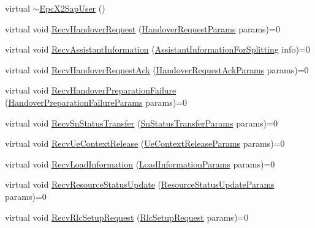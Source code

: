 \begin{DoxyCompactItemize}
\item 
virtual \hyperlink{classns3_1_1EpcX2SapUser_a8ae15c36ec4225df3cec2fdefcfc7837}{$\sim$\+Epc\+X2\+Sap\+User} ()
\item 
virtual void \hyperlink{classns3_1_1EpcX2SapUser_ac89cf3449fc971960e4c7a7a9af23c7d}{Recv\+Handover\+Request} (\hyperlink{structns3_1_1EpcX2Sap_1_1HandoverRequestParams}{Handover\+Request\+Params} params)=0
\item 
virtual void \hyperlink{classns3_1_1EpcX2SapUser_a4c52bc66e831a21ec8049e28760e2209}{Recv\+Assistant\+Information} (\hyperlink{structns3_1_1EpcX2Sap_1_1AssistantInformationForSplitting}{Assistant\+Information\+For\+Splitting} info)=0
\item 
virtual void \hyperlink{classns3_1_1EpcX2SapUser_a5e390d132f3f8433838aec1719a52bc2}{Recv\+Handover\+Request\+Ack} (\hyperlink{structns3_1_1EpcX2Sap_1_1HandoverRequestAckParams}{Handover\+Request\+Ack\+Params} params)=0
\item 
virtual void \hyperlink{classns3_1_1EpcX2SapUser_a805d5df676c49aedd76711dbdb980e17}{Recv\+Handover\+Preparation\+Failure} (\hyperlink{structns3_1_1EpcX2Sap_1_1HandoverPreparationFailureParams}{Handover\+Preparation\+Failure\+Params} params)=0
\item 
virtual void \hyperlink{classns3_1_1EpcX2SapUser_a261f30dd348d5abc9a270ef904c986c0}{Recv\+Sn\+Status\+Transfer} (\hyperlink{structns3_1_1EpcX2Sap_1_1SnStatusTransferParams}{Sn\+Status\+Transfer\+Params} params)=0
\item 
virtual void \hyperlink{classns3_1_1EpcX2SapUser_a141e3d6880234990ccde32a16554e7d6}{Recv\+Ue\+Context\+Release} (\hyperlink{structns3_1_1EpcX2Sap_1_1UeContextReleaseParams}{Ue\+Context\+Release\+Params} params)=0
\item 
virtual void \hyperlink{classns3_1_1EpcX2SapUser_a3f780370974059b6ec3d115f5b1757d8}{Recv\+Load\+Information} (\hyperlink{structns3_1_1EpcX2Sap_1_1LoadInformationParams}{Load\+Information\+Params} params)=0
\item 
virtual void \hyperlink{classns3_1_1EpcX2SapUser_a7d0fa47a75bd24b12f15f4b5a1c7b253}{Recv\+Resource\+Status\+Update} (\hyperlink{structns3_1_1EpcX2Sap_1_1ResourceStatusUpdateParams}{Resource\+Status\+Update\+Params} params)=0
\item 
virtual void \hyperlink{classns3_1_1EpcX2SapUser_af982d60c31e400c220777b2930470474}{Recv\+Rlc\+Setup\+Request} (\hyperlink{structns3_1_1EpcX2Sap_1_1RlcSetupRequest}{Rlc\+Setup\+Request} params)=0

\end{DoxyCompactItemize}

